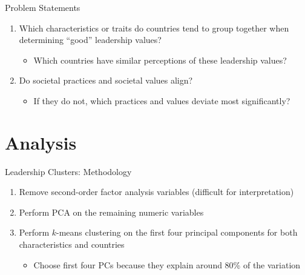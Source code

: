 \documentclass[
  ignorenonframetext,
]{beamer}
\providecommand{\tightlist}{%
  \setlength{\itemsep}{0pt}\setlength{\parskip}{0pt}}
\begin{document}
\begin{frame}{Problem Statements}
\protect\hypertarget{problem-statements}{}
\begin{enumerate}
\tightlist
\item
  Which characteristics or traits do countries tend to group together
  when determining ``good'' leadership values?

  \begin{itemize}
  \tightlist
  \item
    Which countries have similar perceptions of these leadership values?
  \end{itemize}
\item
  Do societal practices and societal values align?

  \begin{itemize}
  \tightlist
  \item
    If they do not, which practices and values deviate most
    significantly?
  \end{itemize}
\end{enumerate}
\end{frame}

\hypertarget{analysis}{%
\section{Analysis}\label{analysis}}

\begin{frame}{Leadership Clusters: Methodology}
\protect\hypertarget{leadership-clusters-methodology}{}
\begin{enumerate}
\item
  Remove second-order factor analysis variables (difficult for
  interpretation)
\item
  Perform PCA on the remaining numeric variables
\item
  Perform \(k\)-means clustering on the first four principal components
  for both characteristics and countries

  \begin{itemize}
  \tightlist
  \item
    Choose first four PCs because they explain around 80\% of the
    variation
  \end{itemize}
\end{enumerate}
\end{frame}
\end{document}
